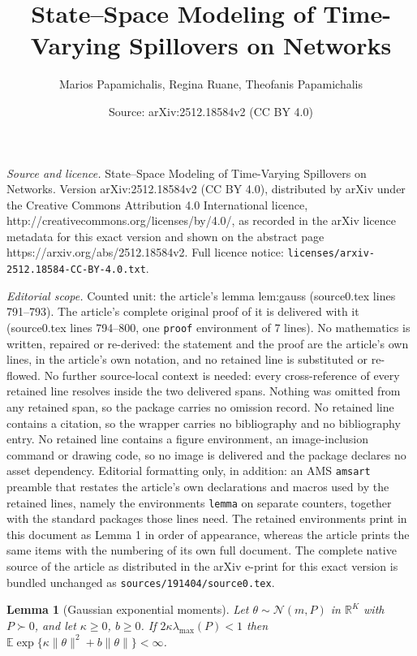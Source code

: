 \documentclass[10pt,a4paper]{amsart}
\title{State--Space Modeling of Time-Varying Spillovers on Networks}
\author{Marios Papamichalis, Regina Ruane, Theofanis Papamichalis}
\date{Source: arXiv:2512.18584v2 (CC BY 4.0)}
\newtheorem{lemma}{Lemma}
\newcommand{\E}{\mathbb{E}}
\newcommand{\R}{\mathbb{R}}
\newcommand{\calN}{\mathcal{N}}
\begin{document}
\maketitle

\noindent\emph{Source and licence.} State--Space Modeling of Time-Varying Spillovers on Networks. Version arXiv:2512.18584v2 (CC BY 4.0), distributed by arXiv under the Creative Commons Attribution 4.0 International licence, http://creativecommons.org/licenses/by/4.0/, as recorded in the arXiv licence metadata for this exact version and shown on the abstract page https://arxiv.org/abs/2512.18584v2. Full licence notice: \texttt{licenses/arxiv-2512.18584-CC-BY-4.0.txt}.\par\smallskip

\noindent\textit{Editorial scope.} Counted unit: the article's lemma lem:gauss (source0.tex lines 791--793). The article's complete original proof of it is delivered with it (source0.tex lines 794--800, one \texttt{proof} environment of 7 lines). No mathematics is written, repaired or re-derived: the statement and the proof are the article's own lines, in the article's own notation, and no retained line is substituted or re-flowed.  No further source-local context is needed: every cross-reference of every retained line resolves inside the two delivered spans.  Nothing was omitted from any retained span, so the package carries no omission record.  No retained line contains a citation, so the wrapper carries no bibliography and no bibliography entry.  No retained line contains a figure environment, an image-inclusion command or drawing code, so no image is delivered and the package declares no asset dependency.  Editorial formatting only, in addition: an AMS \texttt{amsart} preamble that restates the article's own declarations and macros used by the retained lines, namely the environments \texttt{lemma} on separate counters, together with the standard packages those lines need.  The retained environments print in this document as Lemma 1 in order of appearance, whereas the article prints the same items with the numbering of its own full document.  The complete native source of the article as distributed in the arXiv e-print for this exact version is bundled unchanged as \texttt{sources/191404/source0.tex}.
\begin{lemma}[Gaussian exponential moments]\label{lem:gauss}
Let $\theta\sim\calN(m,P)$ in $\R^K$ with $P\succ0$, and let $\kappa\ge0$, $b\ge0$. If $2\kappa\lambda_{\max}(P)<1$ then $\E\exp\{\kappa\|\theta\|^2+b\|\theta\|\}<\infty$.
\end{lemma}
\end{document}
